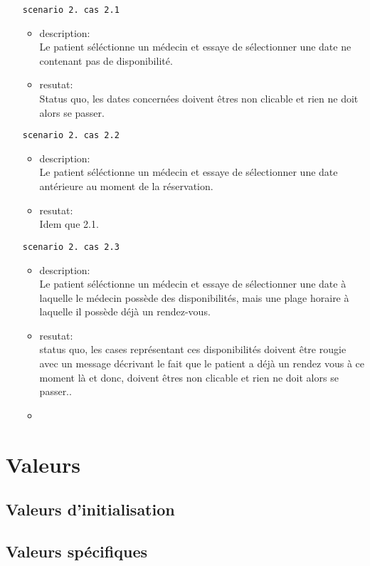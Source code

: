 \documentclass[a4paper, 11pt]{report}
\begin{document}
\begin{itemize}
\begin{itemize}
					(appel de l’UC1101)
			\end{itemize}
		\item[\texttt{scenario 2. cas 2.1}]
			\begin{itemize}
				\item description:\\
					Le patient séléctionne un médecin et essaye de sélectionner
					une date ne contenant pas de disponibilité.
				\item resutat: \\
					Status quo, les dates concernées doivent êtres non clicable
					et rien ne doit alors se passer.
			\end{itemize}
		\item[\texttt{scenario 2. cas 2.2}]
			\begin{itemize}
				\item description:\\
					Le patient séléctionne un médecin et essaye de sélectionner
					une date antérieure au moment de la réservation.
				\item resutat: \\
					Idem que 2.1.
			\end{itemize}
		\item[\texttt{scenario 2. cas 2.3}]
			\begin{itemize}
				\item description:\\
					Le patient séléctionne un médecin et essaye de sélectionner
					une date à laquelle le médecin possède des disponibilités,
					mais une plage horaire à laquelle il possède déjà un
					rendez-vous.
				\item resutat: \\
					status quo, les cases représentant ces disponibilités
					doivent être rougie avec un message décrivant le fait que le
					patient a déjà un rendez vous à ce moment là et donc,
					doivent êtres non clicable et rien ne doit alors se passer..
				\item 
			\end{itemize}
	\end{itemize}
	\section{Valeurs}
	\subsection{Valeurs d'initialisation}
	\subsection{Valeurs spécifiques}


	
\end{document}
